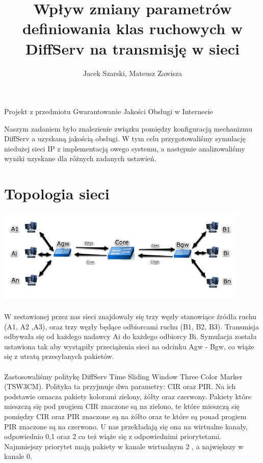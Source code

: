 \documentclass[a4paper]{article}
\title{Wpływ zmiany parametrów definiowania klas ruchowych w DiffServ na transmisję w sieci}
\author{Jacek Szarski, Mateusz Zawisza}
\begin{document}
\maketitle


{\large Projekt z przedmiotu Gwarantowanie Jakości Obsługi w Internecie}


\pagebreak

Naszym zadaniem było znalezienie związku pomiędzy konfiguracją mechanizmu DiffServ a uzyskaną jakością obsługi. W tym celu przygotowaliśmy symulację niedużej sieci IP z implementacją owego systemu, a następnie analizowaliśmy wyniki uzyskane dla różnych zadanych ustawień.


\section{Topologia sieci}

\includegraphics[width=120mm]{images/topologia.jpeg}

\paragraph{}
W zestawionej przez nas sieci znajdowały się trzy węzły stanowiące źródła ruchu (A1, A2 ,A3), oraz trzy węzły będące odbiorcami ruchu (B1, B2, B3). Transmisja odbywała się od każdego nadawcy Ai do każdego odbiorcy Bi. Symulacja została ustawiona tak aby wystąpiły przeciążenia sieci na odcinku Agw - Bgw, co wiąże się z utratą przesyłanych pakietów.

\paragraph{}
Zastosowaliśmy politykę DiffServ Time Sliding Window Three Color Marker (TSW3CM).
Polityka ta przyjmuje dwa parametry: CIR oraz PIR. Na ich podstawie oznacza pakiety kolorami zielony, żółty oraz czerwony. Pakiety które mieszczą się pod progiem CIR znaczone są na zielono, te które mieszczą się pomiędzy CIR oraz PIR znaczone są na żółto oraz te które są ponad progiem PIR znaczone są na czerwono. U nas przekładają się ona na wirtualne kanały, odpowiednio 0,1 oraz 2 co też wiąże się z odpowiednimi priorytetami. Najmniejszy priorytet mają pakiety w kanale wirtualnym 2 , a największy w kanale 0.
\end{document}
